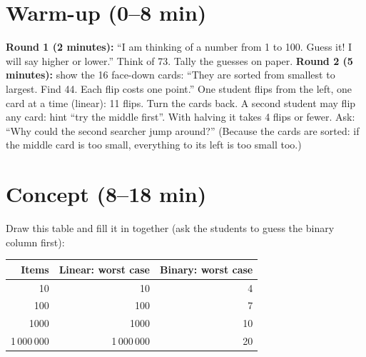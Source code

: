 \section{Warm-up (0--8 min)}
\begin{unplugged}
\textbf{Round 1 (2 minutes):} \enquote{I am thinking of a number from 1 to 100. Guess it! I will say higher or lower.} Think of 73. Tally the guesses on paper.
\textbf{Round 2 (5 minutes):} show the 16 face-down cards: \enquote{They are sorted from smallest to largest. Find 44. Each flip costs one point.} One student flips from the left, one card at a time (linear): 11 flips. Turn the cards back. A second student may flip any card: hint \enquote{try the middle first}. With halving it takes 4 flips or fewer.
Ask: \enquote{Why could the second searcher jump around?} (Because the cards are sorted: if the middle card is too small, everything to its left is too small too.)
\end{unplugged}

\section{Concept (8--18 min)}
Draw this table and fill it in together (ask the students to guess the binary column first):
\begin{center}
\begin{tabular}{@{}rrr@{}}
\toprule
\textbf{Items} & \textbf{Linear: worst case} & \textbf{Binary: worst case} \\ \midrule
10 & 10 & 4 \\
100 & 100 & 7 \\
1000 & 1000 & 10 \\
1\,000\,000 & 1\,000\,000 & 20 \\
\bottomrule
\end{tabular}
\end{center}

